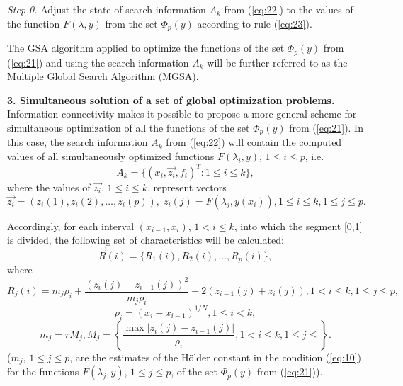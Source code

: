\documentclass[runningheads]{llncs}
\begin{document}
\textit{Step 0.} Adjust the state of search information $A_k$ from (\ref{eq:22}) to the values of the function $F(\lambda, y)$ from the set $\Phi_p(y)$ according to rule (\ref{eq:23}).

The GSA algorithm applied to optimize the functions of the set $\Phi_p(y)$ from (\ref{eq:21}) and using the search information $A_k$ will be further referred to as the Multiple Global Search Algorithm (MGSA).

\textbf{3. Simultaneous solution of a set of global optimization problems.} Information connectivity makes it possible to propose a more general scheme for simultaneous optimization of all the functions of the set $\Phi_p(y)$ from (\ref{eq:21}). In this case, the search information $A_k$ from (\ref{eq:22}) will contain the computed values of all simultaneously optimized functions $F(\lambda_i, y)$, $1 \leq i \leq p$, i.e. 
\begin{equation}
\label{eq:24}
A_k=\{(x_i,\overrightarrow{z_i},f_i )^T : 1 \leq i \leq k\},
\end{equation}
where the values of $\overrightarrow{z_i}$, $1 \leq i \leq k$, represent vectors 
\begin{equation}
\label{eq:25}
\overrightarrow{z_i}=( z_i (1),z_i (2), \dots ,z_i (p)), \; z_i (j)=F(\lambda_j,y(x_i)), 1\leq i \leq k, 1\leq j\leq p.
\end{equation}

Accordingly, for each interval $(x_{i-1},x_i)$, $1 < i \leq k$, into which the segment [0,1] is divided, the following set of characteristics will be calculated:
\begin{equation}
\label{eq:26}
\overrightarrow{R}(i)=\{R_1(i), R_2(i), \dots, R_p(i)\},
\end{equation}
where
\begin{equation}
\label{eq:27}
R_j(i)=m_j \rho_i+\frac{(z_i(j)-z_{i-1}(j))^2}{m_j \rho_i} - 2(z_{i-1}(j)+z_i(j)),1 < i \leq k,1 \leq j \leq p,
\end{equation}
\begin{equation}
\label{eq:28}
\rho_i=(x_i-x_{i-1} )^{1/N}  ,1 \leq i<k,
\end{equation}
\begin{equation}
\label{eq:29}
m_j = r M_j, M_j=\left\{ \frac{\max|z_i (j)-z_{i-1} (j)|}{\rho_i} ,1< i \leq k, 1 \leq j \leq \right\}.
\end{equation}
($m_j$, $1 \leq j \leq p$, are the estimates of the H{\"o}lder  constant in the condition (\ref{eq:10}) for the functions $F(\lambda_j,y)$, $1 \leq j \leq p$, of the set $\Phi_p(y)$ from (\ref{eq:21})).
\end{document}
